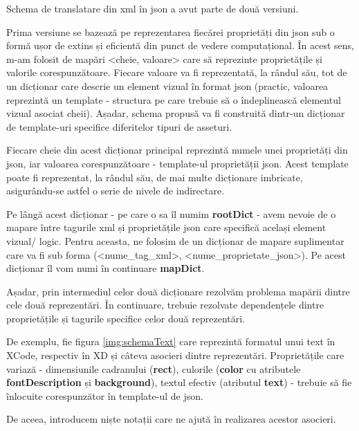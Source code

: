 Schema de translatare din xml în json a avut parte de două versiuni. 

Prima versiune se bazează pe reprezentarea fiecărei proprietăți din json sub o formă ușor de extins și eficientă din punct de vedere computațional. În acest sens, m-am folosit de mapări <cheie, valoare> care să reprezinte proprietățile și valorile corespunzătoare. Fiecare valoare va fi reprezentată, la rândul său, tot de un dicționar care descrie un element vizual în format json (practic, valoarea reprezintă un template - structura pe care trebuie să o îndeplinească elementul vizual asociat cheii). Așadar, schema propusă va fi construită dintr-un dicționar de template-uri specifice diferitelor tipuri de asseturi.

Fiecare cheie din acest dicționar principal reprezintă numele unei proprietăți din json, iar valoarea corespunzătoare - template-ul proprietății json.  Acest template poate fi reprezentat, la rândul său, de mai multe dicționare imbricate, asigurându-se astfel o serie de nivele de indirectare.

Pe lângă acest dicționar - pe care o sa îl numim \textbf{rootDict} - avem nevoie de o mapare între tagurile xml și proprietățile json care specifică același element vizual/ logic. Pentru aceasta, ne folosim de un dicționar de mapare suplimentar care va fi sub forma (<nume_tag_xml>,  <nume_proprietate_json>). Pe acest dicționar îl vom numi în continuare \textbf{mapDict}.

Așadar, prin intermediul celor două dicționare rezolvăm problema mapării dintre cele două reprezentări. 
În continuare, trebuie rezolvate dependențele dintre proprietățile și tagurile specifice celor două reprezentări.




De exemplu, fie figura \ref{img:schemaText} care reprezintă formatul unui text în XCode, respectiv în XD și câteva asocieri dintre reprezentări.
Proprietățile care variază - dimensiunile cadranului (\textbf{rect}), culorile (\textbf{color} cu atributele \textbf{fontDescription} și \textbf{background}), textul efectiv (atributul \textbf{text}) - trebuie să fie înlocuite corespunzător în template-ul de json.


De aceea, introducem niște notații care ne ajută în realizarea acestor asocieri. 
\\

\newtheorem{mydef}{Afirmație}[chapter]
\newtheorem{myNote}{Notă}[chapter]

